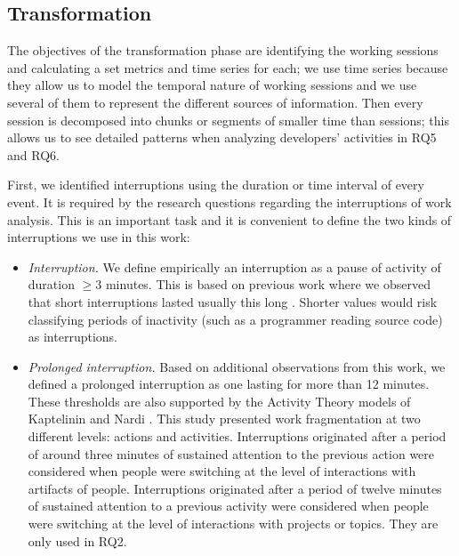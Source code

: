 \subsection{Transformation }

\begin{changedforreviewerlong}
The objectives of the transformation phase are identifying the working sessions and calculating a set metrics and time series for each; we use time series because they allow us to model the temporal nature of working sessions and we use several of them to represent the different sources of information. Then every session is decomposed into chunks or segments of smaller time than sessions; this allows us to see detailed patterns when analyzing developers' activities in RQ5 and RQ6.


First, we identified interruptions using the duration or time interval of every event. It is required by the research questions regarding the interruptions of work analysis. This is an important task and it is convenient to define the two kinds of interruptions we use in this work:
\end{changedforreviewerlong}

\begin{itemize}
	\item \textit{Interruption.} We define empirically an interruption as a pause of activity of duration $\geq 3$ minutes. This is based on previous work where we observed that short interruptions lasted usually this long \cite{GM04}. Shorter values would risk classifying periods of inactivity (such as a programmer reading source code) as interruptions.
	
	\item \textit{Prolonged interruption.} Based on additional observations from this work, we defined a prolonged interruption as one lasting for more than 12 minutes. These thresholds are also supported by the Activity Theory models of Kaptelinin and Nardi \cite{KaptelininN07}. This study presented work fragmentation at two different levels: actions and activities. Interruptions originated after a period of around three minutes of sustained attention to the previous action were considered when people were switching at the level of interactions with artifacts of people. Interruptions originated after a period of twelve minutes of sustained attention to a previous activity were considered when people were switching at the level of interactions with projects or topics. They are only used in RQ2.
\end{itemize}

